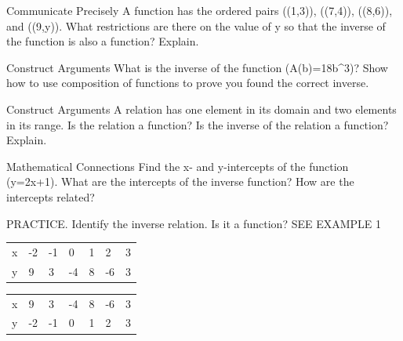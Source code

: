 \documentclass{article}
\newenvironment{practice}[2]{}{}        %
\newcommand{\answer}[1]{}               %
\newcommand{\te}[1]{}                   %
\begin{document}
\begin{practice}{12}{2}
Communicate Precisely A function has the ordered pairs ((1,3)), ((7,4)), ((8,6)), and ((9,y)). What restrictions are there on the value of y so that the inverse of the function is also a function? Explain.
\answer{(y\neq3,4,\text{ or }6) because after the x- and y-coordinates are switched, if the value of y is 3, 4, or 6, each independent value would not be paired with only one dependent value.}
\te{Answer printed on PDF page 84.}
\end{practice}
\begin{practice}{13}{2}
Construct Arguments What is the inverse of the function (A(b)=\frac18b^3)? Show how to use composition of functions to prove you found the correct inverse.
\answer{(a^{-1}(b)=2\sqrt[3]{b}); (a(a^{-1}(b))=\frac18(2\sqrt[3]{b})^3=\frac18(8b)=b); (a^{-1}(a(b))=2\sqrt[3]{\frac18b^3}=2(\frac12b)=b)}
\te{Answer printed on PDF page 84 uses lowercase a for the function named A in the prompt.}
\end{practice}
\begin{practice}{14}{2}
Construct Arguments A relation has one element in its domain and two elements in its range. Is the relation a function? Is the inverse of the relation a function? Explain.
\answer{The relation is not a function because each independent value is not paired with only one dependent value. The inverse of the relation is a function because each independent value is paired with only one dependent value.}
\end{practice}
\begin{practice}{15}{2}
Mathematical Connections Find the x- and y-intercepts of the function (y=2x+1). What are the intercepts of the inverse function? How are the intercepts related?
\answer{x-intercept: ((-\frac12,0)), y-intercept: ((0,1)); x-intercept of the inverse: ((1,0)), y-intercept of the inverse: ((0,-\frac12)); Sample: the x-intercept of the original function becomes the y-intercept of the inverse by reversing the coordinates, and the y-intercept of the original function becomes the x-intercept of the inverse by reversing the coordinates.}
\te{Answer printed on PDF page 86.}
\end{practice}
\begin{practice}{16}{1}
PRACTICE. Identify the inverse relation. Is it a function? SEE EXAMPLE 1
\begin{tabular}{lllllll}
x & -2 & -1 & 0 & 1 & 2 & 3 \\
y & 9 & 3 & -4 & 8 & -6 & 3 \\
\end{tabular}
\answer{The inverse is not a function.}
\begin{tabular}{lllllll}
x & 9 & 3 & -4 & 8 & -6 & 3 \\
y & -2 & -1 & 0 & 1 & 2 & 3 \\
\end{tabular}
\te{Answer printed on PDF page 86.}
\end{practice}
\end{document}
